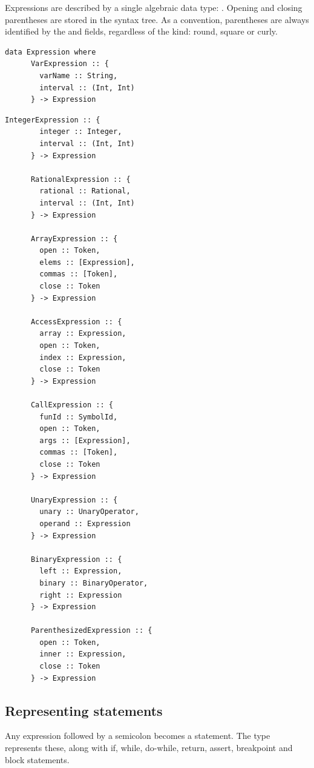 \documentclass[UdineBachThesis,american,11pt]{PhdThesis}
\begin{document}
  Expressions are described by a single algebraic data type:
  \lstinline@Expression@. Opening and closing parentheses are stored in the
  syntax tree. As a convention, parentheses are always identified by the
  \lstinline@open@ and \lstinline@close@ fields, regardless of the kind:
  round, square or curly.

  \begin{lstlisting}[gobble=4,basicstyle=\ttfamily\small]
    data Expression where
      VarExpression :: {
        varName :: String,
        interval :: (Int, Int)
      } -> Expression
  \end{lstlisting}

  \newpage

  \begin{lstlisting}[gobble=4,basicstyle=\ttfamily\small]
      IntegerExpression :: {
        integer :: Integer,
        interval :: (Int, Int)
      } -> Expression

      RationalExpression :: {
        rational :: Rational,
        interval :: (Int, Int)
      } -> Expression

      ArrayExpression :: {
        open :: Token,
        elems :: [Expression],
        commas :: [Token],
        close :: Token
      } -> Expression

      AccessExpression :: {
        array :: Expression,
        open :: Token,
        index :: Expression,
        close :: Token
      } -> Expression

      CallExpression :: {
        funId :: SymbolId,
        open :: Token,
        args :: [Expression],
        commas :: [Token],
        close :: Token
      } -> Expression

      UnaryExpression :: {
        unary :: UnaryOperator,
        operand :: Expression
      } -> Expression

      BinaryExpression :: {
        left :: Expression,
        binary :: BinaryOperator,
        right :: Expression
      } -> Expression

      ParenthesizedExpression :: {
        open :: Token,
        inner :: Expression,
        close :: Token
      } -> Expression
  \end{lstlisting}

  \newpage

  \subsection{Representing statements}

  Any expression followed by a semicolon becomes a statement. The type
  \lstinline@Statement@ represents these, along with if, while, do-while,
  return, assert, breakpoint and block statements.
\end{document}
